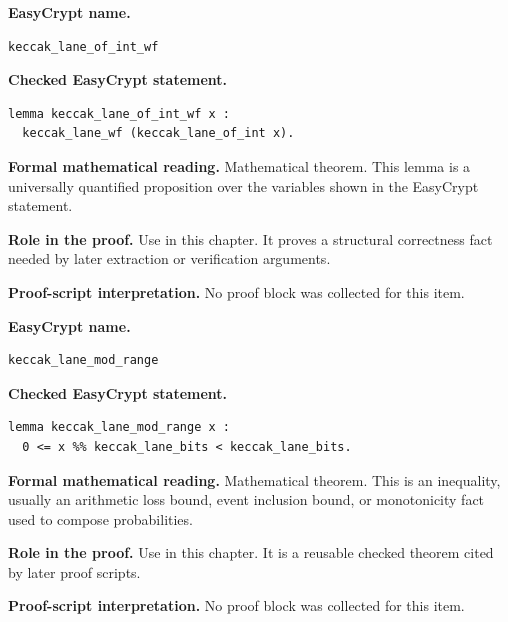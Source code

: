 \begin{formaltheorem}
\noindent\textbf{EasyCrypt name.}
\begin{lstlisting}[language=EasyCrypt,basicstyle=\ttfamily\scriptsize]
keccak_lane_of_int_wf
\end{lstlisting}
\noindent\textbf{Checked EasyCrypt statement.}
\begin{lstlisting}[language=EasyCrypt,basicstyle=\ttfamily\scriptsize]
lemma keccak_lane_of_int_wf x :
  keccak_lane_wf (keccak_lane_of_int x).
\end{lstlisting}
\noindent\textbf{Formal mathematical reading.}
Mathematical theorem. This lemma is a universally quantified proposition over the variables shown in the EasyCrypt statement.

\noindent\textbf{Role in the proof.}
Use in this chapter. It proves a structural correctness fact needed by later extraction or verification arguments.

\noindent\textbf{Proof-script interpretation.}
No proof block was collected for this item.

\end{formaltheorem}

\begin{formaltheorem}
\noindent\textbf{EasyCrypt name.}
\begin{lstlisting}[language=EasyCrypt,basicstyle=\ttfamily\scriptsize]
keccak_lane_mod_range
\end{lstlisting}
\noindent\textbf{Checked EasyCrypt statement.}
\begin{lstlisting}[language=EasyCrypt,basicstyle=\ttfamily\scriptsize]
lemma keccak_lane_mod_range x :
  0 <= x %% keccak_lane_bits < keccak_lane_bits.
\end{lstlisting}
\noindent\textbf{Formal mathematical reading.}
Mathematical theorem. This is an inequality, usually an arithmetic loss bound, event inclusion bound, or monotonicity fact used to compose probabilities.

\noindent\textbf{Role in the proof.}
Use in this chapter. It is a reusable checked theorem cited by later proof scripts.

\noindent\textbf{Proof-script interpretation.}
No proof block was collected for this item.

\end{formaltheorem}

